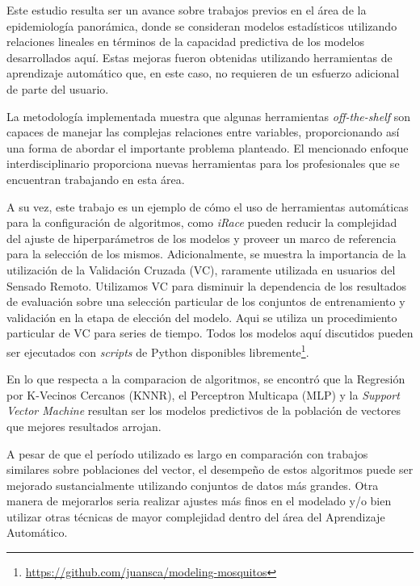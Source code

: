   \par Este estudio resulta ser un avance sobre trabajos previos en el área
    de la epidemiología panorámica, donde se consideran modelos estadísticos utilizando
    relaciones lineales \cite{models_predicting, modis_data, ndwi_erffectiveness}
    en términos de la capacidad predictiva de los modelos desarrollados aquí.
    Estas mejoras fueron obtenidas utilizando herramientas de aprendizaje
    automático que, en este caso, no requieren de un esfuerzo adicional de
    parte del usuario.

  \par La metodología implementada muestra que algunas herramientas \textit{off-the-shelf}
    son capaces de manejar las complejas relaciones entre variables, proporcionando
    así una forma de abordar el importante problema planteado. El mencionado enfoque interdisciplinario
    proporciona nuevas herramientas para los profesionales que se encuentran
    trabajando en esta área.

  \par A su vez, este trabajo es un ejemplo de cómo el uso de herramientas
    automáticas para la configuración de algoritmos, como \textit{iRace} pueden
    reducir la complejidad del ajuste de hiperparámetros de los modelos y
    proveer un marco de referencia para la selección de los mismos.
    Adicionalmente, se muestra la importancia de la utilización de la Validación
    Cruzada (VC), raramente utilizada en usuarios del Sensado Remoto.
    Utilizamos VC para disminuir la dependencia de los resultados de evaluación
    sobre una selección particular de los conjuntos de entrenamiento y validación
    en la etapa de elección del modelo. Aqui se utiliza
    un procedimiento particular de VC para series de tiempo. Todos los modelos
    aquí discutidos pueden ser ejecutados con \textit{scripts} de Python
    disponibles libremente\footnote{\url{https://github.com/juansca/modeling-mosquitos}}.

  \par En lo que respecta a la comparacion de algoritmos, se encontró que la Regresión
    por K-Vecinos Cercanos (KNNR), el Perceptron Multicapa (MLP) y la
    \textit{Support Vector Machine} resultan ser los modelos predictivos de la
    población de vectores que mejores resultados arrojan.


  \par A pesar de que el período utilizado es largo en comparación con trabajos similares
    sobre poblaciones del vector, el desempeño de estos algoritmos puede ser
    mejorado sustancialmente utilizando conjuntos de datos más grandes.
    Otra manera de mejorarlos seria realizar ajustes más finos en el modelado
    y/o bien utilizar otras técnicas de mayor complejidad dentro del área del
    Aprendizaje Automático.

